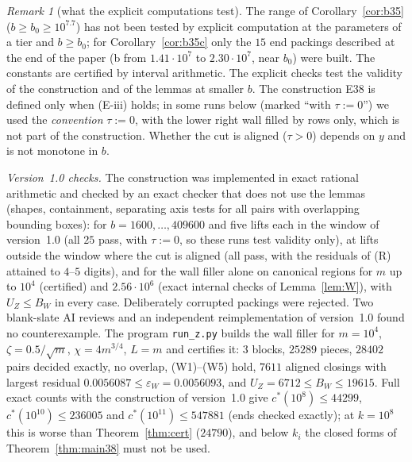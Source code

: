 \documentclass[11pt]{amsart}
\newcommand{\cs}{c^{*}}
\theoremstyle{definition}
\theoremstyle{remark}
\newtheorem{remark}[theorem]{Remark}
\numberwithin{equation}{section}
\begin{document}
\begin{remark}[what the explicit computations test]\label{rem:38exact}
The range of Corollary~\ref{cor:b35} ($b\ge b_0\ge10^{7.7}$) has not been tested by explicit computation at the
parameters of a tier and $b\ge b_0$; for Corollary~\ref{cor:b35c} only the $15$ end packings described at the end of the
paper (b from $1.41\cdot10^7$ to $2.30\cdot10^7$, near $b_0$) were built. The constants are certified by interval
arithmetic.
The explicit checks test
the validity of the construction and of the lemmas at smaller $b$. The construction E38 is defined only when (E-iii)
holds; in some runs below (marked ``with $\tau:=0$'') we used the \emph{convention} $\tau:=0$, with the lower right wall
filled by rows only, which is not part of the construction. Whether the cut is aligned ($\tau>0$) depends on $y$ and is
not monotone in $b$.

\emph{Version~1.0 checks.} The construction was implemented in exact rational arithmetic and checked by an exact checker
that does not use the lemmas (shapes, containment, separating axis tests for all pairs with overlapping bounding boxes):
for $b=1600,\dots,409600$ and five lifts each in the window of version~1.0 (all $25$ pass, with $\tau:=0$, so these runs
test validity only), at lifts outside the window where the cut is aligned (all pass, with the residuals of (R) attained
to $4$--$5$ digits), and for the wall filler alone on canonical regions for $m$ up to $10^4$ (certified) and
$2.56\cdot10^6$ (exact internal checks of Lemma~\ref{lem:W}), with $U_Z\le B_W$ in every case. Deliberately corrupted
packings were rejected. Two blank-slate AI reviews and an independent reimplementation of version~1.0 found no
counterexample. The program \texttt{run\_z.py} builds the wall filler for $m=10^4$, $\zeta=0.5/\sqrt m$,
$\chi=4m^{3/4}$, $L=m$ and certifies it: $3$ blocks, $25289$ pieces, $28402$ pairs decided exactly, no overlap, (W1)--(W5)
hold, $7611$ aligned closings with largest residual $0.0056087\le\varepsilon_W=0.0056093$, and $U_Z=6712\le B_W\le19615$.
Full exact counts with the construction of version~1.0 give $\cs(10^8)\le44299$, $\cs(10^{10})\le236005$ and
$\cs(10^{11})\le547881$ (ends checked exactly); at $k=10^8$ this is worse than Theorem~\ref{thm:cert} ($24790$), and
below $k_i$ the closed forms of Theorem~\ref{thm:main38} must not be used.


\end{remark}
\end{document}
